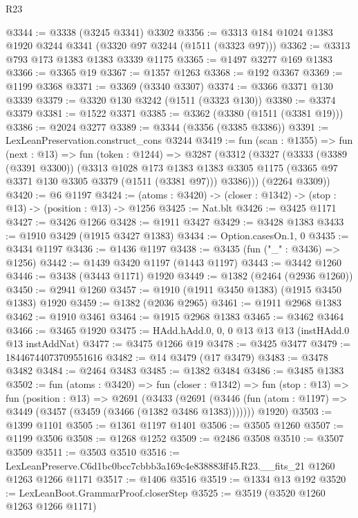 \begin{lexlean}{R23}
\begin{coremodule}
@3344 := @3338 (@3245 @3341) @3302
@3356 := @3313 @184 @1024 @1383 @1920 @3244 @3341 (@3320 @97 @3244 (@1511 (@3323 @97)))
@3362 := @3313 @793 @173 @1383 @1383 @3339 @1175
@3365 := @1497 @3277 @169 @1383
@3366 := @3365 @19
@3367 := @1357 @1263
@3368 := @192 @3367
@3369 := @1199 @3368
@3371 := @3369 (@3340 @3307)
@3374 := @3366 @3371 @130 @3339
@3379 := @3320 @130 @3242 (@1511 (@3323 @130))
@3380 := @3374 @3379
@3381 := @1522 @3371
@3385 := @3362 (@3380 (@1511 (@3381 @19)))
@3386 := @2024 @3277
@3389 := @3344 (@3356 (@3385 @3386))
@3391 := LexLeanPreservation.construct_cons @3244
@3419 := fun (scan : @1355) =>
  fun (next : @13) =>
  fun (token : @1244) =>
  @3287
    (@3312
      (@3327
        (@3333
          (@3389 (@3391 @3300))
          (@3313
            @1028
            @173
            @1383
            @1383
            @3305
            @1175
            (@3365 @97 @3371 @130 @3305 @3379 (@1511 (@3381 @97)))
            @3386)))
      (@2264 @3309))
@3420 := @6 @1197
@3424 := (atoms : @3420) -> (closer : @1342) -> (stop : @13) -> (position : @13) -> @1256
@3425 := Nat.blt
@3426 := @3425 @1171
@3427 := @3426 @1266
@3428 := @1911 @3427
@3429 := @3428 @1383
@3433 := @1910 @3429 (@1915 @3427 @1383)
@3434 := Option.casesOn.{1, 0}
@3435 := @3434 @1197
@3436 := @1436 @1197
@3438 := @3435 (fun ("_" : @3436) => @1256)
@3442 := @1439 @3420 @1197 (@1443 @1197)
@3443 := @3442 @1260
@3446 := @3438 (@3443 @1171) @1920
@3449 := @1382 (@2464 (@2936 @1260))
@3450 := @2941 @1260
@3457 := @1910 (@1911 @3450 @1383) (@1915 @3450 @1383) @1920
@3459 := @1382 (@2036 @2965)
@3461 := @1911 @2968 @1383
@3462 := @1910 @3461
@3464 := @1915 @2968 @1383
@3465 := @3462 @3464
@3466 := @3465 @1920
@3475 := HAdd.hAdd.{0, 0, 0} @13 @13 @13 (instHAdd.{0} @13 instAddNat)
@3477 := @3475 @1266 @19
@3478 := @3425 @3477
@3479 := 18446744073709551616
@3482 := @14 @3479 (@17 @3479)
@3483 := @3478 @3482
@3484 := @2464 @3483
@3485 := @1382 @3484
@3486 := @3485 @1383
@3502 := fun (atoms : @3420) =>
  fun (closer : @1342) =>
  fun (stop : @13) =>
  fun (position : @13) =>
  @2691
    (@3433
      (@2691 (@3446 (fun (atom : @1197) => @3449 (@3457 (@3459 (@3466 (@1382 @3486 @1383)))))))
      @1920)
@3503 := @1399 @1101
@3505 := @1361 @1197 @1401
@3506 := @3505 @1260
@3507 := @1199 @3506
@3508 := @1268 @1252
@3509 := @2486 @3508
@3510 := @3507 @3509
@3511 := @3503 @3510
@3516 := LexLeanPreserve.C6d1bc0bcc7cbbb3a169c4e838883ff45.R23.__fits_21 @1260 @1263 @1266 @1171
@3517 := @1406 @3516
@3519 := @1334 @13 @192
@3520 := LexLeanBoot.GrammarProof.closerStep
@3525 := @3519 (@3520 @1260 @1263 @1266 @1171)

\end{coremodule}
\end{lexlean}

